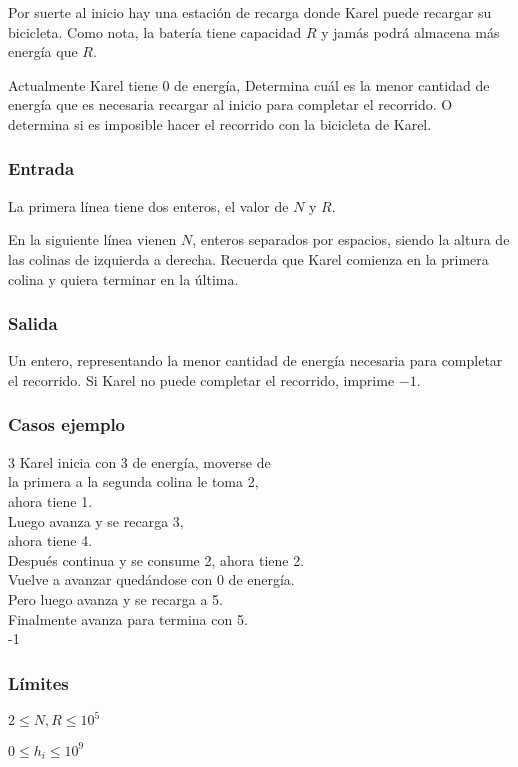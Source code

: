 Por suerte al inicio hay una estación de recarga donde Karel puede recargar su bicicleta. Como nota, la batería tiene capacidad \(R\) y jamás podrá almacena más energía que \(R\).

Actualmente Karel tiene \(0\) de energía, Determina cuál es la menor cantidad de energía que es necesaria recargar al inicio para completar el recorrido. O determina si es imposible hacer el recorrido con la bicicleta de Karel.

\subsubsection*{Entrada}
La primera línea tiene dos enteros, el valor de \(N\) y \(R\).

En la siguiente línea vienen \(N\), enteros separados por espacios, siendo la altura de las colinas de izquierda a derecha. Recuerda que Karel comienza en la primera colina y quiera terminar en la última.
\subsubsection*{Salida}
Un entero, representando la menor cantidad de energía necesaria para completar el recorrido. Si Karel no puede completar el recorrido, imprime \(-1\).

\subsubsection*{Casos ejemplo}
\begin{casebox3}	
	{3}
	{
		Karel inicia con 3 de energía, moverse de   \\
		la primera a la segunda colina le toma 2,  \\
		ahora tiene 1.\\
		Luego avanza y se recarga 3,\\
		ahora tiene 4.\\
		Después continua y se consume 2, ahora tiene 2. \\
		Vuelve a avanzar quedándose con 0 de energía. \\		
		Pero luego avanza y se recarga a 5. \\
		Finalmente avanza para termina con 5. \\
	}
	{-1}
	{}
	\hline
\end{casebox3}	

\subsubsection*{Límites}
\begin{plimits}
	\item \(2\leq N, R \leq 10^5\)
	\item \(0\leq h_i\leq 10^9\)
\end{plimits}

